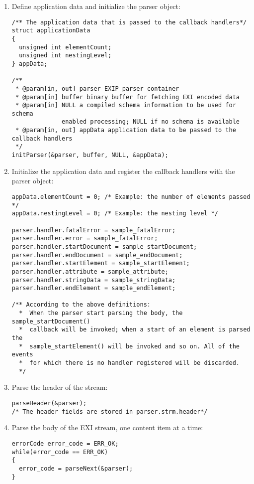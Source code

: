 \begin{enumerate}
 \item Define application data and initialize the parser object:
\begin{lstlisting}
/** The application data that is passed to the callback handlers*/
struct applicationData
{
  unsigned int elementCount;
  unsigned int nestingLevel;
} appData;

/**
 * @param[in, out] parser EXIP parser container
 * @param[in] buffer binary buffer for fetching EXI encoded data
 * @param[in] NULL a compiled schema information to be used for schema
		      enabled processing; NULL if no schema is available
 * @param[in, out] appData application data to be passed to the callback handlers
 */  
initParser(&parser, buffer, NULL, &appData);    
\end{lstlisting}

 \item Initialize the application data and register the callback handlers with the parser object:
\begin{lstlisting}
appData.elementCount = 0; /* Example: the number of elements passed */
appData.nestingLevel = 0; /* Example: the nesting level */

parser.handler.fatalError = sample_fatalError;
parser.handler.error = sample_fatalError;
parser.handler.startDocument = sample_startDocument;
parser.handler.endDocument = sample_endDocument;
parser.handler.startElement = sample_startElement;
parser.handler.attribute = sample_attribute;
parser.handler.stringData = sample_stringData;
parser.handler.endElement = sample_endElement;

/** According to the above definitions:
  *  When the parser start parsing the body, the sample_startDocument()
  *  callback will be invoked; when a start of an element is parsed the
  *  sample_startElement() will be invoked and so on. All of the events
  *  for which there is no handler registered will be discarded. 
  */
\end{lstlisting}

 \item Parse the header of the stream:
\begin{lstlisting}
parseHeader(&parser);
/* The header fields are stored in parser.strm.header*/
\end{lstlisting}

 \item Parse the body of the EXI stream, one content item at a time:
\begin{lstlisting}
errorCode error_code = ERR_OK;
while(error_code == ERR_OK)
{
  error_code = parseNext(&parser);
}


\end{lstlisting}
\end{enumerate}
